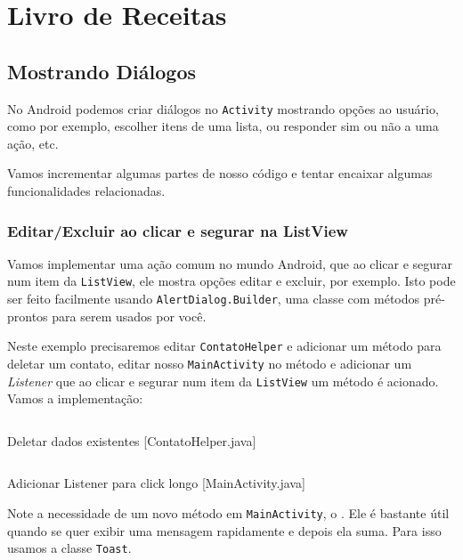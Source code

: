 \chapter{Livro de Receitas}

\section{Mostrando Diálogos}

No Android podemos criar diálogos no \texttt{Activity} mostrando opções ao usuário, como por exemplo,
escolher itens de uma lista, ou responder sim ou não a uma ação, etc.

Vamos incrementar algumas partes de nosso código e tentar encaixar algumas funcionalidades
relacionadas.

\subsection{Editar/Excluir ao clicar e segurar na ListView}

Vamos implementar uma ação comum no mundo Android, que ao clicar e segurar num item
da \texttt{ListView}, ele mostra opções editar e excluir, por exemplo. Isto pode ser
feito facilmente usando \texttt{AlertDialog.Builder}, uma classe com métodos pré-prontos
para serem usados por você.

Neste exemplo precisaremos editar \texttt{ContatoHelper} e adicionar um método para
deletar um contato, editar nosso \texttt{MainActivity} no método 
e adicionar um \textit{Listener} que ao clicar e segurar num item da \texttt{ListView}
um método é acionado. Vamos a implementação:

\begin{listing}[H]
  \inputminted[linenos=true,frame=bottomline,tabsize=3]{ java }{ source/ContatoHelper-5.java }
  \caption{Deletar dados existentes [ContatoHelper.java]}
\end{listing}

\begin{listing}[H]
  \inputminted[linenos=true,frame=bottomline,tabsize=3]{ java }{ source/MainActivity-8.java }
  \caption{Adicionar Listener para click longo [MainActivity.java]}
\end{listing}

Note a necessidade de um novo método em \texttt{MainActivity}, o .
Ele é bastante útil quando se quer exibir uma mensagem rapidamente e depois ela suma.
Para isso usamos a classe \texttt{Toast}.

